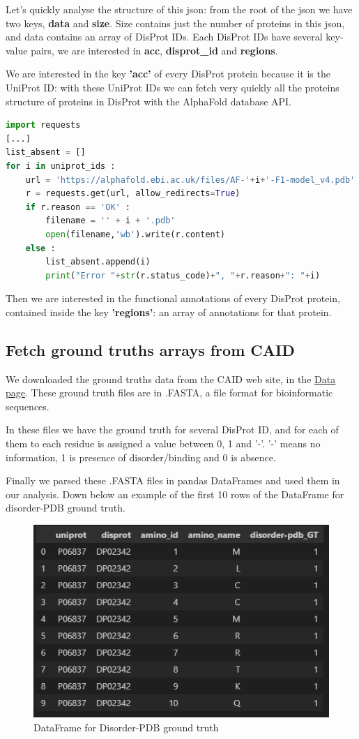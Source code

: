 Let's quickly analyse the structure of this json: from the root of the json we have two keys, \textbf{data} and \textbf{size}. Size contains just the number of proteins in this json, and data contains an array of DisProt IDs. Each DisProt IDs have several key-value pairs, we are interested in \textbf{acc}, \textbf{disprot\_id} and \textbf{regions}.

We are interested in the key \textbf{'acc'} of every DisProt protein because it is the UniProt ID: with these UniProt IDs we can fetch very quickly all the proteins structure of proteins in DisProt with the AlphaFold database API.
\begin{lstlisting}[language=Python, caption=Script to use AlphaFold database API]
import requests
[...]
list_absent = []
for i in uniprot_ids :
    url = 'https://alphafold.ebi.ac.uk/files/AF-'+i+'-F1-model_v4.pdb'
    r = requests.get(url, allow_redirects=True)
    if r.reason == 'OK' :
        filename = '' + i + '.pdb'
        open(filename,'wb').write(r.content)
    else :
        list_absent.append(i)
        print("Error "+str(r.status_code)+", "+r.reason+": "+i)
\end{lstlisting}

Then we are interested in the functional annotations of every DisProt protein, contained inside the key \textbf{'regions'}:  an array of annotations for that protein.

\pagebreak

\subsection{Fetch ground truths arrays from CAID}
We downloaded the ground truths data from the CAID web site, in the \href{https://caid.idpcentral.org/challenge#Data}{\underline{Data page}}. These ground truth files are in .FASTA, a file format for bioinformatic sequences. 

In these files we have the ground truth for several DisProt ID, and for each of them to each residue is assigned a value between 0, 1 and '-'. '-' means no information, 1 is presence of disorder/binding and 0 is absence.

Finally we parsed these .FASTA files in pandas DataFrames and used them in our analysis. Down below an example of the first 10 rows of the DataFrame for disorder-PDB ground truth.

\begin{figure}
    \centering
    \includegraphics{res/analysis/disorderpdb.png}
    \caption{DataFrame for Disorder-PDB ground truth}
\end{figure}